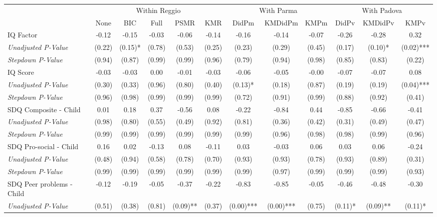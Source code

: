 \begin{tabular}{l c c c c c c c c c c c}
\toprule
& \multicolumn{5}{c}{Within Reggio} & \multicolumn{3}{c}{With Parma} & \multicolumn{3}{c}{With Padova} \\\cmidrule(lr){2-6} \cmidrule(lr){7-9} \cmidrule(lr){10-12}
 & None & BIC & Full & PSMR & KMR & DidPm & KMDidPm & KMPm & DidPv & KMDidPv & KMPv \\
\midrule
IQ Factor & -0.12 & -0.15 & -0.03 & -0.06 & -0.14 & -0.16 & -0.14 & -0.07 & -0.26 & -0.28 & 0.32 \\
\quad \textit{Unadjusted P-Value} & (0.22) & (0.15)* & (0.78) & (0.53) & (0.25) & (0.23) & (0.29) & (0.45) & (0.17) & (0.10)* & (0.02)*** \\
\quad \textit{Stepdown P-Value} & (0.94) & (0.87) & (0.99) & (0.99) & (0.96) & (0.79) & (0.94) & (0.98) & (0.85) & (0.83) & (0.22) \\
IQ Score & -0.03 & -0.03 & 0.00 & -0.01 & -0.03 & -0.06 & -0.05 & -0.00 & -0.07 & -0.07 & 0.08 \\
\quad \textit{Unadjusted P-Value} & (0.30) & (0.33) & (0.96) & (0.80) & (0.40) & (0.13)* & (0.18) & (0.87) & (0.19) & (0.19) & (0.04)*** \\
\quad \textit{Stepdown P-Value} & (0.96) & (0.98) & (0.99) & (0.99) & (0.99) & (0.72) & (0.91) & (0.99) & (0.88) & (0.92) & (0.41) \\
SDQ Composite - Child & 0.01 & 0.18 & 0.37 & -0.56 & 0.08 & -0.22 & -0.84 & 0.44 & -0.85 & -0.66 & -0.41 \\
\quad \textit{Unadjusted P-Value} & (0.98) & (0.80) & (0.55) & (0.49) & (0.92) & (0.81) & (0.36) & (0.42) & (0.31) & (0.49) & (0.47) \\
\quad \textit{Stepdown P-Value} & (0.99) & (0.99) & (0.99) & (0.99) & (0.99) & (0.99) & (0.96) & (0.98) & (0.98) & (0.99) & (0.96) \\
SDQ Pro-social - Child & 0.16 & 0.02 & -0.13 & 0.08 & -0.11 & 0.03 & -0.03 & 0.06 & 0.03 & 0.06 & -0.24 \\
\quad \textit{Unadjusted P-Value} & (0.48) & (0.94) & (0.58) & (0.78) & (0.70) & (0.93) & (0.93) & (0.78) & (0.93) & (0.89) & (0.31) \\
\quad \textit{Stepdown P-Value} & (0.99) & (0.99) & (0.99) & (0.99) & (0.99) & (0.99) & (0.97) & (0.99) & (0.99) & (0.99) & (0.93) \\
SDQ Peer problems - Child & -0.12 & -0.19 & -0.05 & -0.37 & -0.22 & -0.83 & -0.85 & -0.05 & -0.46 & -0.48 & -0.30 \\
\quad \textit{Unadjusted P-Value} & (0.51) & (0.38) & (0.81) & (0.09)** & (0.37) & (0.00)*** & (0.00)*** & (0.75) & (0.11)* & (0.09)** & (0.11)* \\

\end{tabular}

